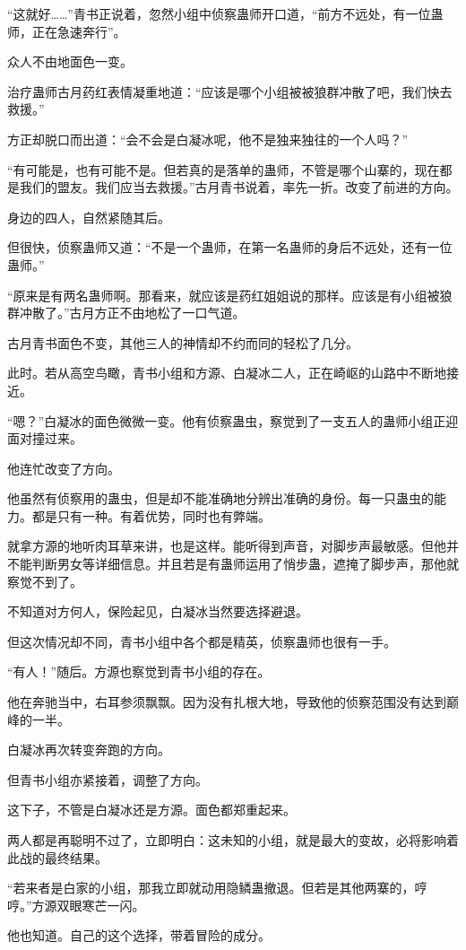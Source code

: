 \begin{this_body}
“这就好……”青书正说着，忽然小组中侦察蛊师开口道，“前方不远处，有一位蛊师，正在急速奔行”。

众人不由地面色一变。

治疗蛊师古月药红表情凝重地道：“应该是哪个小组被被狼群冲散了吧，我们快去救援。”

方正却脱口而出道：“会不会是白凝冰呢，他不是独来独往的一个人吗？”

“有可能是，也有可能不是。但若真的是落单的蛊师，不管是哪个山寨的，现在都是我们的盟友。我们应当去救援。”古月青书说着，率先一折。改变了前进的方向。

身边的四人，自然紧随其后。

但很快，侦察蛊师又道：“不是一个蛊师，在第一名蛊师的身后不远处，还有一位蛊师。”

“原来是有两名蛊师啊。那看来，就应该是药红姐姐说的那样。应该是有小组被狼群冲散了。”古月方正不由地松了一口气道。

古月青书面色不变，其他三人的神情却不约而同的轻松了几分。

此时。若从高空鸟瞰，青书小组和方源、白凝冰二人，正在崎岖的山路中不断地接近。

“嗯？”白凝冰的面色微微一变。他有侦察蛊虫，察觉到了一支五人的蛊师小组正迎面对撞过来。

他连忙改变了方向。

他虽然有侦察用的蛊虫，但是却不能准确地分辨出准确的身份。每一只蛊虫的能力。都是只有一种。有着优势，同时也有弊端。

就拿方源的地听肉耳草来讲，也是这样。能听得到声音，对脚步声最敏感。但他并不能判断男女等详细信息。并且若是有蛊师运用了悄步蛊，遮掩了脚步声，那他就察觉不到了。

不知道对方何人，保险起见，白凝冰当然要选择避退。

但这次情况却不同，青书小组中各个都是精英，侦察蛊师也很有一手。

“有人！”随后。方源也察觉到青书小组的存在。

他在奔驰当中，右耳参须飘飘。因为没有扎根大地，导致他的侦察范围没有达到巅峰的一半。

白凝冰再次转变奔跑的方向。

但青书小组亦紧接着，调整了方向。

这下子，不管是白凝冰还是方源。面色都郑重起来。

两人都是再聪明不过了，立即明白：这未知的小组，就是最大的变故，必将影响着此战的最终结果。

“若来者是白家的小组，那我立即就动用隐鳞蛊撤退。但若是其他两寨的，哼哼。”方源双眼寒芒一闪。

他也知道。自己的这个选择，带着冒险的成分。


\end{this_body}

